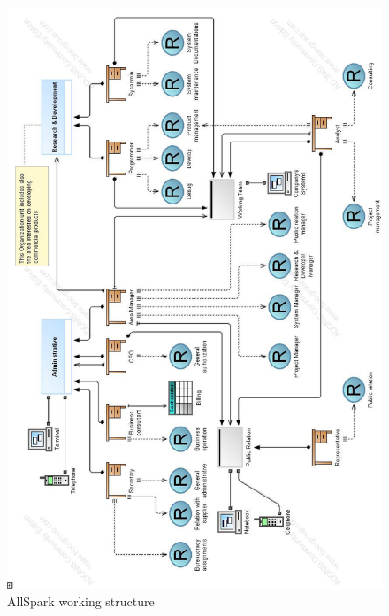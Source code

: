 \begin{figure}
\begin{centering}
\includegraphics[scale=0.45]{assign2/adonis/imgs/working_structure.jpg}
\caption{AllSpark working structure}
\label{2img:working}
\end{centering}
\end{figure}
 
